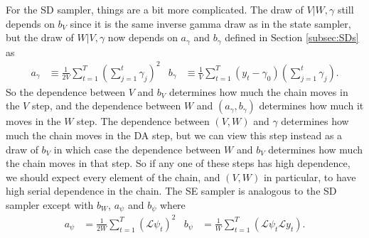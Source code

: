 \documentclass{article}
\begin{document}
For the SD sampler, things are a bit more complicated. The draw of $V|W,\gamma$ still depends on $b_V$ since it is the same inverse gamma draw as in the state sampler, but the draw of $W|V,\gamma$ now depends on $a_\gamma$ and $b_\gamma$ defined in Section \ref{subsec:SDs} as
\begin{align*}
  a_\gamma &\equiv \frac{1}{2V}\sum_{t=1}^T\left(\sum_{j=1}^t\gamma_j\right)^2&
  b_\gamma &\equiv \frac{1}{V}\sum_{t=1}^T(y_t-\gamma_0)\left(\sum_{j=1}^t\gamma_j\right).
\end{align*}
So the dependence between $V$ and $b_V$ determines how much the chain moves in the $V$ step, and the dependence between $W$ and $(a_\gamma , b_\gamma)$ determines how much it moves in the $W$ step. The dependence between $(V,W)$ and $\gamma$ determines how much the chain moves in the DA step, but we can view this step instead as a draw of $b_V$ in which case the dependence between $W$ and $b_V$ determines how much the chain moves in that step. So if any one of these steps has high dependence, we should expect every element of the chain, and $(V,W)$ in particular, to have high serial dependence in the chain. The SE sampler is analogous to the SD sampler except with $b_W$, $a_\psi$ and $b_\psi$ where
\begin{align*}
  a_\psi&=\frac{1}{2W}\sum_{t=1}^T(\mathcal{L}\psi_t)^2&
  b_\psi&=\frac{1}{W}\sum_{t=1}^T(\mathcal{L}\psi_t\mathcal{L}y_t).
\end{align*}
\end{document}
